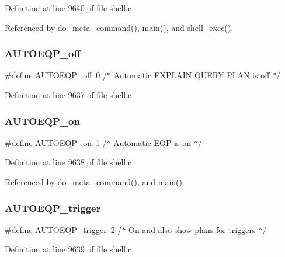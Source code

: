 Definition at line 9640 of file shell.\+c.



Referenced by do\+\_\+meta\+\_\+command(), main(), and shell\+\_\+exec().

\mbox{\label{shell_8c_aad42db4cd8bd5860781db0ab630193d5}} 
\subsubsection{A\+U\+T\+O\+E\+Q\+P\+\_\+off}
{\footnotesize\ttfamily \#define A\+U\+T\+O\+E\+Q\+P\+\_\+off~0           /$\ast$ Automatic E\+X\+P\+L\+A\+IN Q\+U\+E\+RY P\+L\+AN is off $\ast$/}



Definition at line 9637 of file shell.\+c.

\mbox{\label{shell_8c_aaa21e7b4d922d10f6a5516ffce896e65}} 
\subsubsection{A\+U\+T\+O\+E\+Q\+P\+\_\+on}
{\footnotesize\ttfamily \#define A\+U\+T\+O\+E\+Q\+P\+\_\+on~1           /$\ast$ Automatic E\+QP is on $\ast$/}



Definition at line 9638 of file shell.\+c.



Referenced by do\+\_\+meta\+\_\+command(), and main().

\mbox{\label{shell_8c_a74f14ba1f6fe208c97f722e20a18efa1}} 
\subsubsection{A\+U\+T\+O\+E\+Q\+P\+\_\+trigger}
{\footnotesize\ttfamily \#define A\+U\+T\+O\+E\+Q\+P\+\_\+trigger~2           /$\ast$ On and also show plans for triggers $\ast$/}



Definition at line 9639 of file shell.\+c.



